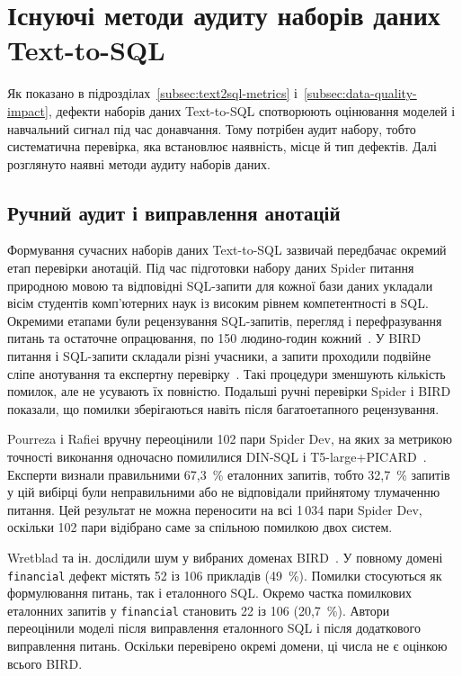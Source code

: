 \documentclass[a4paper,14pt,oneside]{extreport}
\begin{document}
\section{Існуючі методи аудиту наборів даних Text-to-SQL}
\label{sec:annotation-audit}

Як показано в підрозділах~\ref{subsec:text2sql-metrics} і~\ref{subsec:data-quality-impact}, дефекти наборів даних Text-to-SQL спотворюють оцінювання моделей і навчальний сигнал під час донавчання. Тому потрібен аудит набору, тобто систематична перевірка, яка встановлює наявність, місце й тип дефектів. Далі розглянуто наявні методи аудиту наборів даних.

\subsection{Ручний аудит і виправлення анотацій}
\label{subsec:manual-audit}

Формування сучасних наборів даних Text-to-SQL зазвичай передбачає окремий етап перевірки анотацій. Під час підготовки набору даних Spider питання природною мовою та відповідні SQL-запити для кожної бази даних укладали вісім студентів комп'ютерних наук із високим рівнем компетентності в SQL. Окремими етапами були рецензування SQL-запитів, перегляд і перефразування питань та остаточне опрацювання, по 150 людино-годин кожний~\cite{yu2018spider}. У BIRD питання і SQL-запити складали різні учасники, а запити проходили подвійне сліпе анотування та експертну перевірку~\cite{li2023bird}. Такі процедури зменшують кількість помилок, але не усувають їх повністю. Подальші ручні перевірки Spider і BIRD показали, що помилки зберігаються навіть після багатоетапного рецензування.

Pourreza і Rafiei вручну переоцінили 102 пари Spider Dev, на яких за метрикою точності виконання одночасно помилилися DIN-SQL і T5-large+PICARD~\cite{pourreza2023evaluating}. Експерти визнали правильними 67,3~\% еталонних запитів, тобто 32,7~\% запитів у цій вибірці були неправильними або не відповідали прийнятому тлумаченню питання. Цей результат не можна переносити на всі 1\,034 пари Spider Dev, оскільки 102 пари відібрано саме за спільною помилкою двох систем.

Wretblad та ін. дослідили шум у вибраних доменах BIRD~\cite{wretblad2024noise}. У повному домені \texttt{financial} дефект містять 52 із 106 прикладів (49~\%). Помилки стосуються як формулювання питань, так і еталонного SQL. Окремо частка помилкових еталонних запитів у \texttt{financial} становить 22 із 106 (20,7~\%). Автори переоцінили моделі після виправлення еталонного SQL і після додаткового виправлення питань. Оскільки перевірено окремі домени, ці числа не є оцінкою всього BIRD.
\end{document}
